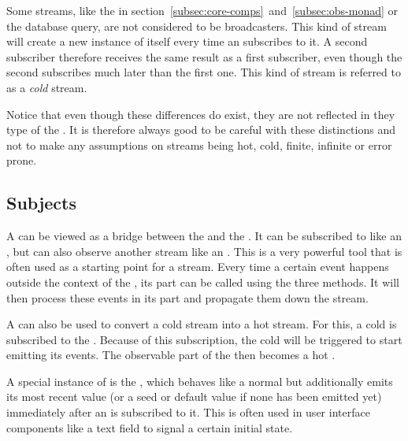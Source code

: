 Some streams, like the  in section~\ref{subsec:core-comps}~and~\ref{subsec:obs-monad} or the database query, are not considered to be broadcasters. This kind of stream will create a new instance of itself every time an \obv subscribes to it. A second subscriber therefore receives the same result as a first subscriber, even though the second subscribes much later than the first one. This kind of stream is referred to as a \textit{cold} stream.


Notice that even though these differences do exist, they are not reflected in they type of the \obs. It is therefore always good to be careful with these distinctions and not to make any assumptions on streams being hot, cold, finite, infinite or error prone.

\subsection{Subjects}
A \subj can be viewed as a bridge between the \obv and the \obs. It can be subscribed to like an \obs, but can also observe another stream like an \obv. This is a very powerful tool that is often used as a starting point for a stream. Every time a certain event happens outside the context of the \subj, its \obv part can be called using the three methods. It will then process these events in its \obs part and propagate them down the stream.

A \subj can also be used to convert a cold stream into a hot stream. For this, a cold \obs is subscribed to the \subj. Because of this subscription, the cold \obs will be triggered to start emitting its events. The observable part of the \subj then becomes a hot \obs.

A special instance of \subj is the \bsubj, which behaves like a normal \subj but additionally emits its most recent value (or a seed or default value if none has been emitted yet) immediately after an \obv is subscribed to it. This is often used in user interface components like a text field to signal a certain initial state.